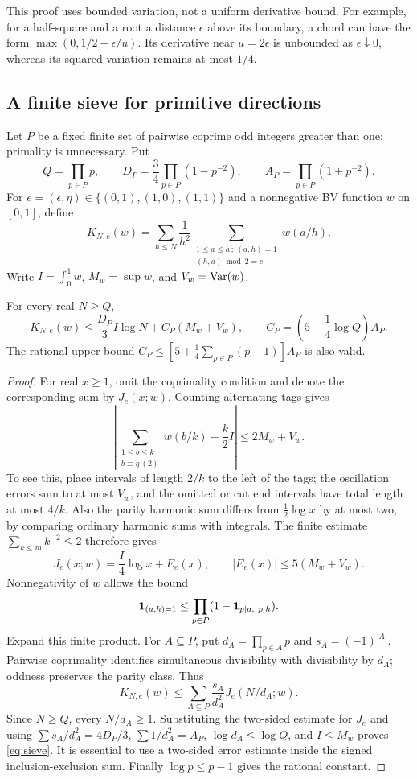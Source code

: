 This proof uses bounded variation, not a uniform derivative bound.
For example, for a half-square and a root a distance \(\epsilon\)
above its boundary, a chord can have the form
\(\max(0,1/2-\epsilon/u)\). Its derivative near \(u=2\epsilon\)
is unbounded as \(\epsilon\downarrow0\), whereas its squared
variation remains at most \(1/4\).

\subsection{A finite sieve for primitive directions}\label{sec:sieve}
Let \(P\) be a fixed finite set of pairwise coprime odd integers greater
than one; primality is unnecessary. Put
\[
 Q=\prod_{p\in P}p,\qquad
 D_P=\frac34\prod_{p\in P}(1-p^{-2}),\qquad
 A_P=\prod_{p\in P}(1+p^{-2}).
\]
For \(e=(\epsilon,\eta)\in\{(0,1),(1,0),(1,1)\}\) and a nonnegative
BV function \(w\) on \([0,1]\), define
\[
 K_{N,e}(w)=\sum_{h\le N}\frac1{h^2}
 \sum_{\substack{1\le a\le h\,;\ (a,h)=1\\(h,a)\bmod2=e}}w(a/h).
\]
Write \(I=\int_0^1w\), \(M_w=\sup w\), and \(V_w=\operatorname{Var}(w)\).

\begin{lemma}\label{lem:sieve}
For every real \(N\ge Q\),
\begin{equation}\label{eq:sieve}
 K_{N,e}(w)\le\frac{D_P}{3}I\log N+C_P(M_w+V_w),\qquad
 C_P=\left(5+\frac14\log Q\right)A_P.
\end{equation}
The rational upper bound
\(C_P\le[5+\tfrac14\sum_{p\in P}(p-1)]A_P\) is also valid.
\end{lemma}
\begin{proof}
For real \(x\ge1\), omit the coprimality condition and denote the
corresponding sum by \(J_e(x;w)\). Counting alternating tags gives
\[
 \left|\sum_{\substack{1\le b\le k\\b\equiv\eta\ (2)}}w(b/k)
       -\frac k2 I\right|\le2M_w+V_w.
\]
To see this, place intervals of length \(2/k\) to the left of the
tags; the oscillation errors sum to at most \(V_w\), and the omitted
or cut end intervals have total length at most \(4/k\).
Also the parity harmonic sum differs from \(\tfrac12\log x\)
by at most two, by comparing ordinary harmonic sums with integrals.
The finite estimate \(\sum_{k\le m}k^{-2}\le2\) therefore gives
\[
 J_e(x;w)=\frac I4\log x+E_e(x),\qquad
 |E_e(x)|\le5(M_w+V_w).
\]
Nonnegativity of \(w\) allows the bound
\[
 \mathbf 1_{(a,h)=1}\le
 \prod_{p\in P}(1-\mathbf 1_{p\mid a,\ p\mid h}).
\]
Expand this finite product. For \(A\subseteq P\), put
\(d_A=\prod_{p\in A}p\) and \(s_A=(-1)^{|A|}\).
Pairwise coprimality identifies simultaneous divisibility with
divisibility by \(d_A\); oddness preserves the parity class. Thus
\[
 K_{N,e}(w)\le\sum_{A\subseteq P}\frac{s_A}{d_A^2}J_e(N/d_A;w).
\]
Since \(N\ge Q\), every \(N/d_A\ge1\). Substituting the two-sided
estimate for \(J_e\) and using
\(\sum s_A/d_A^2=4D_P/3\), \(\sum1/d_A^2=A_P\),
\(\log d_A\le\log Q\), and \(I\le M_w\) proves
\eqref{eq:sieve}. It is essential to use a two-sided error estimate
inside the signed inclusion-exclusion sum. Finally \(\log p\le p-1\)
gives the rational constant.
\end{proof}

